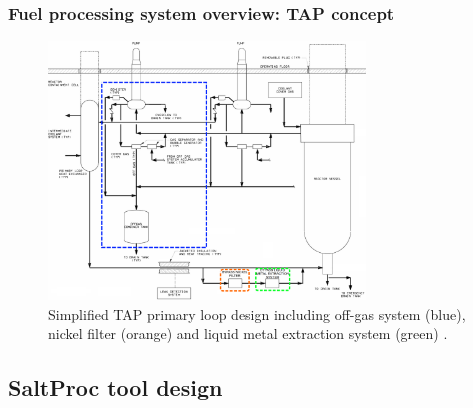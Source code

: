 \begin{frame}
\frametitle{Fuel processing system overview: TAP concept}
	\vspace{-2mm}
\begin{figure}[htp!] %
	\centering
	\includegraphics[width=0.75\textwidth]{../dissertation/figures/ch4/tap_primary_loop.png}
		\vspace{-2mm}
	\caption{Simplified \gls{TAP} primary loop design including off-gas system 
		(blue), nickel filter (orange) and liquid metal extraction system 
		(green) \cite{transatomic_power_transatomic_2019}.}
\end{figure}

\end{frame}


\subsection{SaltProc tool design}


